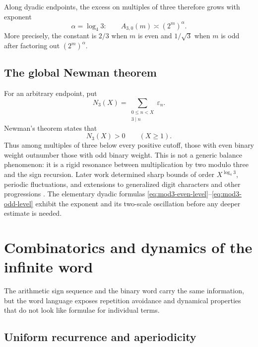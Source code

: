 \documentclass[11pt,oneside]{article}
\theoremstyle{definition}
\theoremstyle{remark}
\newcommand{\eps}{\varepsilon}
\begin{document}
Along dyadic endpoints, the excess on multiples of three therefore grows with exponent
\begin{equation}
  \alpha=\log_4 3:\qquad
  A_{3,0}(m)\asymp (2^m)^\alpha.                            \label{eq:Newman-exponent}
\end{equation}
More precisely, the constant is \(2/3\) when \(m\) is even and \(1/\sqrt3\) when \(m\) is
odd after factoring out \((2^m)^\alpha\).

\subsection{The global Newman theorem}

For an arbitrary endpoint, put
\begin{equation}
  N_3(X)=\sum_{\substack{0\le n<X\\3\mid n}}\eps_n.        \label{eq:Newman-sum}
\end{equation}
Newman's theorem states that
\begin{equation}
  \boxed{N_3(X)>0\qquad(X\ge1).}                            \label{eq:Newman-positivity}
\end{equation}
Thus among multiples of three below every positive cutoff, those with even binary weight
outnumber those with odd binary weight.  This is not a generic balance phenomenon: it is a
rigid resonance between multiplication by two modulo three and the sign recursion.  Later
work determined sharp bounds of order \(X^{\log_4 3}\), periodic fluctuations, and
extensions to generalized digit characters and other progressions
\cite{newman1969,drmotaskalba2000,drmotastoll2008}.  The elementary dyadic formulas
\eqref{eq:mod3-even-level}--\eqref{eq:mod3-odd-level} exhibit the exponent and its two-scale
oscillation before any deeper estimate is needed.

\section{Combinatorics and dynamics of the infinite word}
\label{sec:words}

The arithmetic sign sequence and the binary word carry the same information, but the word
language exposes repetition avoidance and dynamical properties that do not look like
formulae for individual terms.

\subsection{Uniform recurrence and aperiodicity}
\end{document}

